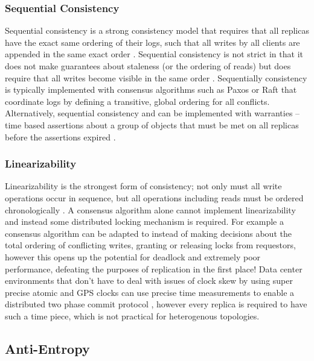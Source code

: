 \documentclass{article}
\begin{document}
\subsubsection{Sequential Consistency}

Sequential consistency is a strong consistency model that requires that all replicas have the exact same ordering of their logs, such that all writes by all clients are appended in the same exact order \cite{attiya_sequential_1994}. Sequential consistency is not strict in that it does not make guarantees about staleness (or the ordering of reads) but does require that all writes become visible in the same order \cite{bermbach_consistency_2013}. Sequentially consistency is typically implemented with consensus algorithms such as Paxos \cite{lamport_fast_2006} or Raft \cite{ongaro_search_2014} that coordinate logs by defining a transitive, global ordering for all conflicts. Alternatively, sequential consistency and can be implemented with warranties -- time based assertions about a group of objects that must be met on all replicas before the assertions expired \cite{liu_warranties_2014}.

\subsubsection{Linearizability}

Linearizability is the strongest form of consistency; not only must all write operations occur in sequence, but all operations including reads must be ordered chronologically \cite{herlihy_linearizability:_1990}. A consensus algorithm alone cannot implement linearizability and instead some distributed locking mechanism is required. For example a consensus algorithm can be adapted to instead of making decisions about the total ordering of conflicting writes, granting or releasing locks from requestors, however this opens up the potential for deadlock and extremely poor performance, defeating the purposes of replication in the first place! Data center environments that don't have to deal with issues of clock skew by using super precise atomic and GPS clocks can use precise time measurements to enable a distributed two phase commit protocol \cite{corbett_spanner:_2013}, however every replica is required to have such a time piece, which is not practical for heterogenous topologies.

\subsection{Anti-Entropy}
\end{document}
